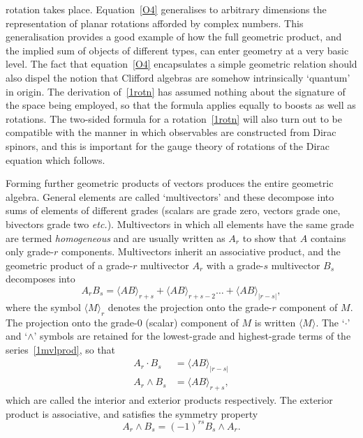 \documentclass[a4paper]{article}
\numberwithin{equation}{section}
\newcommand{\dt}{\! \cdot \!}
\newcommand{\wdg}{\! \wedge \!}
\newcommand{\la}{\langle}
\newcommand{\ra}{\rangle}
\newcommand{\eqv}{=}
\begin{document}
rotation takes place.  Equation~\eqref{O4} generalises to arbitrary
dimensions the representation of planar rotations afforded by complex
numbers.  This generalisation provides a good example of how the full
geometric product, and the implied sum of objects of different types,
can enter geometry at a very basic level.  The fact that
equation~\eqref{O4} encapsulates a simple geometric relation should also
dispel the notion that Clifford algebras are somehow intrinsically
`quantum' in origin.  The derivation of~\eqref{1rotn} has assumed nothing
about the signature of the space being employed, so that the formula
applies equally to boosts as well as rotations.  The two-sided formula
for a rotation~\eqref{1rotn} will also turn out to be compatible with the
manner in which observables are constructed from Dirac spinors, and
this is important for the gauge theory of rotations of the Dirac
equation which follows.

Forming further geometric products of vectors produces the entire
geometric algebra.  General elements are called `multivectors' and
these decompose into sums of elements of different grades (scalars are
grade zero, vectors grade one, bivectors grade two {\em etc.}).
Multivectors in which all elements have the same grade are termed {\em
homogeneous} and are usually written as $A_r$ to show that $A$
contains only grade-$r$ components.  Multivectors inherit an
associative product, and the geometric product of a grade-$r$
multivector $A_r$ with a grade-$s$ multivector $B_s$ decomposes into
%
\begin{equation} 
A_{r}B_{s} = \la AB \ra_{r+s} +  \la AB \ra_{r+s-2}
\ldots  + \la AB \ra_{|r-s|} ,
\label{1mvlprod}
\end{equation}
%
where the symbol $\la M\ra_r$ denotes the projection onto the
grade-$r$ component of $M$.  The projection onto the grade-0 (scalar)
component of $M$ is written $\la M\ra$.  The `$ \cdot $' and `$
\wedge$' symbols are retained for the lowest-grade and highest-grade
terms of the series~\eqref{1mvlprod}, so that
%
\begin{align}
A_r \dt B_s &\eqv  \la AB \ra_{|r-s|} \label{1intprod} \\
A_r \wdg B_s &\eqv  \la AB \ra_{r+s} , 
\end{align}
%
which are called the interior and exterior products respectively.  
The exterior product is associative, and satisfies the
symmetry property
%
\begin{equation}
A_r \wdg B_s = (-1)^{rs} B_s \wdg A_r.
\end{equation}
\end{document}
